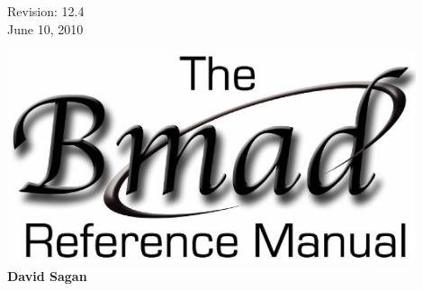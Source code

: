 \thispagestyle{empty}

\begin{flushright}
\large
  Revision: 12.4 \\
  June 10, 2010 \\
\end{flushright}

\vfill

{
\begin{center}
\includegraphics[width=12cm]{bmad-ref-manual.eps} \\
\vskip 0.3in
\huge\bf David Sagan
\end{center}
}

\vfill
\break

